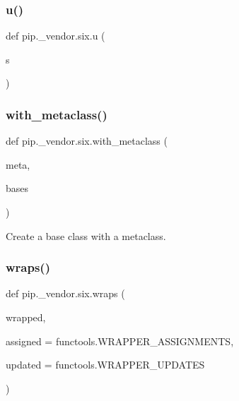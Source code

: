 \subsubsection{\texorpdfstring{u()}{u()}}
{\footnotesize\ttfamily def pip.\+\_\+vendor.\+six.\+u (\begin{DoxyParamCaption}\item[{}]{s }\end{DoxyParamCaption})}

\mbox{\label{namespacepip_1_1__vendor_1_1six_a14b7cf798c1c133414050a65faa225a0}} 
\subsubsection{\texorpdfstring{with\+\_\+metaclass()}{with\_metaclass()}}
{\footnotesize\ttfamily def pip.\+\_\+vendor.\+six.\+with\+\_\+metaclass (\begin{DoxyParamCaption}\item[{}]{meta,  }\item[{}]{bases }\end{DoxyParamCaption})}

\begin{DoxyVerb}Create a base class with a metaclass.\end{DoxyVerb}
 \mbox{\label{namespacepip_1_1__vendor_1_1six_a173274a498f02f13e419b728879d07d6}} 
\subsubsection{\texorpdfstring{wraps()}{wraps()}}
{\footnotesize\ttfamily def pip.\+\_\+vendor.\+six.\+wraps (\begin{DoxyParamCaption}\item[{}]{wrapped,  }\item[{}]{assigned = {\ttfamily functools.WRAPPER\+\_\+ASSIGNMENTS},  }\item[{}]{updated = {\ttfamily functools.WRAPPER\+\_\+UPDATES} }\end{DoxyParamCaption})}



